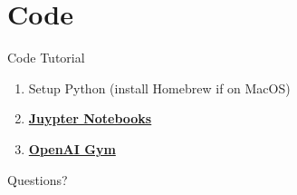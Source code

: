 \documentclass[10pt]{beamer}
\begin{document}
\section{Code}

\begin{frame}{Code Tutorial}
    \begin{enumerate}
        \item Setup Python (install Homebrew if on MacOS)
        \item \href{http://jupyter.org/install.html}{\textbf{Juypter Notebooks}}
        \item \href{https://gym.openai.com/docs}{\textbf{OpenAI Gym}}
    \end{enumerate}
\end{frame}

\begin{frame}[standout]
  Questions?
\end{frame}

\appendix
\end{document}
